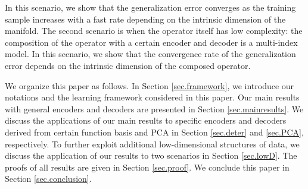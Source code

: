 \documentclass[11pt]{article} %
\begin{document}
\begin{enumerate}
	In this scenario, we show that the generalization error converges as the training sample increases with a fast rate depending on the intrinsic dimension of the manifold. The second scenario is when the operator itself has low complexity: the composition of the operator with a certain encoder and decoder is a multi-index model. In this scenario, we show that the convergence rate of the generalization error depends on the intrinsic dimension of the composed operator.
\end{enumerate}

We organize this paper as follows. In Section \ref{sec.framework}, we introduce our notations and the learning framework considered in this paper. Our main results with general encoders and decoders are presented in Section \ref{sec.mainresults}. We discuss the applications of our main results to specific encoders and decoders derived from certain function basis and PCA in Section \ref{sec.deter} and \ref{sec.PCA}, respectively. To %
further exploit additional low-dimensional structures of data, we discuss the application of our results to two scenarios %
in Section \ref{sec.lowD}. The proofs of all results are given in Section \ref{sec.proof}. We conclude this paper in Section \ref{sec.conclusion}.
\end{document}
